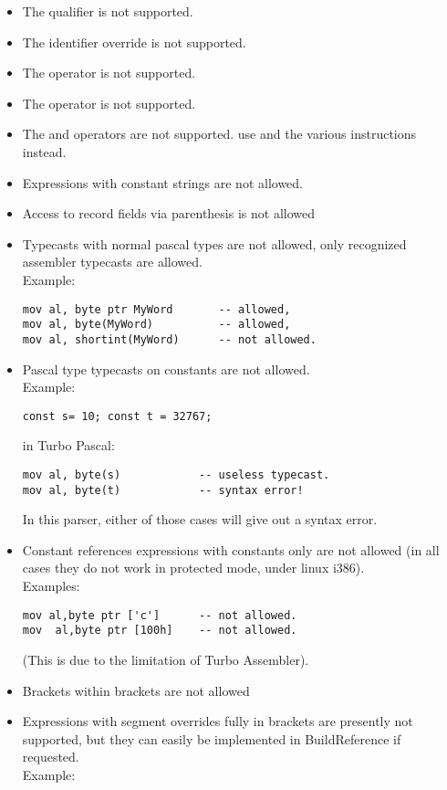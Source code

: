 \documentclass{report}
\begin{document}
\begin{itemize}
\item  The  qualifier is not supported.
\item  The \var{\&} identifier override is not supported.
\item  The  operator is not supported.
\item  The  operator is not supported.
\item  The  and  operators are not supported.
     use  and the various  instructions instead.
\item  Expressions with constant strings are not allowed.
\item  Access to record fields via parenthesis is not allowed
\item  Typecasts with normal pascal types are not allowed, only
    recognized assembler typecasts are allowed.\\ Example:
\begin{verbatim}
mov al, byte ptr MyWord       -- allowed,
mov al, byte(MyWord)          -- allowed,
mov al, shortint(MyWord)      -- not allowed.
\end{verbatim}
\item  Pascal type typecasts on constants are not allowed. \\
Example:
\begin{verbatim}
const s= 10; const t = 32767;
\end{verbatim}
in Turbo Pascal:
\begin{verbatim}
mov al, byte(s)            -- useless typecast.
mov al, byte(t)            -- syntax error!
\end{verbatim}
In this parser, either of those  cases will give out a syntax error.
\item  Constant references expressions with constants only are not
   allowed (in all cases they do not work in protected mode,
    under linux i386). \\ Examples:
\begin{verbatim}
mov al,byte ptr ['c']      -- not allowed.
mov  al,byte ptr [100h]    -- not allowed.
\end{verbatim}
 (This is due to the limitation of Turbo Assembler).
\item  Brackets within brackets are not allowed
\item  Expressions with segment overrides fully in brackets are
presently not supported, but they can easily be implemented
in BuildReference if requested. \\ Example:

\end{itemize}
\end{document}

